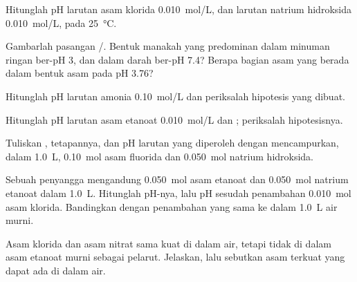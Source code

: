 \begin{exercise}[$\star$]\label{exo:b1:predominant-reaction:3}
Hitunglah pH larutan asam klorida \qty{0.010}{mol/L}, dan larutan
natrium hidroksida \qty{0.010}{mol/L}, pada \qty{25}{\celsius}.
\end{exercise}

\begin{exercise}[$\star$]\label{exo:b1:predominant-reaction:4}
Gambarlah  pasangan /.
Bentuk manakah yang predominan dalam minuman ringan ber-pH 3, dan dalam
darah ber-pH 7.4? Berapa bagian asam yang berada dalam bentuk asam pada
pH 3.76?
\end{exercise}

\begin{exercise}[$\star\star$]\label{exo:b1:predominant-reaction:5}
Hitunglah pH larutan amonia \qty{0.10}{mol/L} dan periksalah hipotesis
yang dibuat.
\end{exercise}

\begin{exercise}[$\star\star$]\label{exo:b1:predominant-reaction:6}
Hitunglah pH larutan asam etanoat \qty{0.010}{mol/L} dan ; periksalah hipotesisnya.
\end{exercise}

\begin{exercise}[$\star\star$]\label{exo:b1:predominant-reaction:7}
Tuliskan , tetapannya, dan pH larutan yang diperoleh
dengan mencampurkan, dalam \qty{1.0}{L}, \qty{0.10}{mol} asam fluorida
dan \qty{0.050}{mol} natrium hidroksida.
\end{exercise}

\begin{exercise}[$\star\star$]\label{exo:b1:predominant-reaction:8}
Sebuah penyangga mengandung \qty{0.050}{mol} asam etanoat dan
\qty{0.050}{mol} natrium etanoat dalam \qty{1.0}{L}. Hitunglah pH-nya,
lalu pH sesudah penambahan \qty{0.010}{mol} asam klorida. Bandingkan
dengan penambahan yang sama ke dalam \qty{1.0}{L} air murni.
\end{exercise}

\begin{exercise}[$\star\star$]\label{exo:b1:predominant-reaction:9}
Asam klorida dan asam nitrat sama kuat di dalam air, tetapi tidak di
dalam asam etanoat murni sebagai pelarut. Jelaskan, lalu sebutkan asam
terkuat yang dapat ada di dalam air.
\end{exercise}

